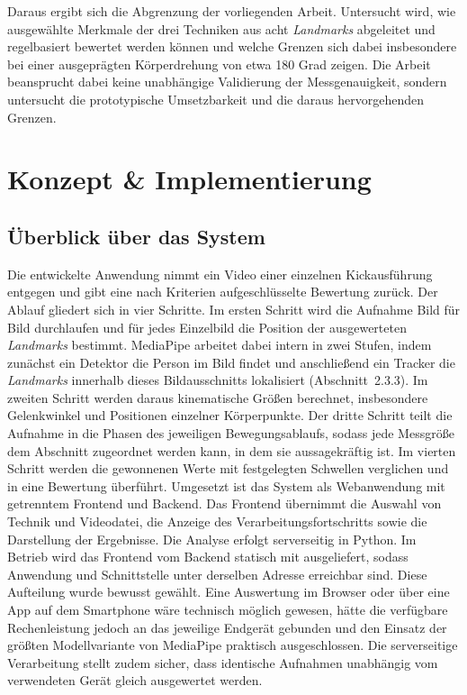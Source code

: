 \documentclass[intern]{cgMA}
\begin{document}
Daraus ergibt sich die Abgrenzung der vorliegenden Arbeit. Untersucht wird, wie ausgewählte Merkmale der drei Techniken aus acht \textit{Landmarks} abgeleitet und regelbasiert bewertet werden können und welche Grenzen sich dabei insbesondere bei einer ausgeprägten Körperdrehung von etwa 180 Grad zeigen. Die Arbeit beansprucht dabei keine unabhängige Validierung der Messgenauigkeit, sondern untersucht die prototypische Umsetzbarkeit und die daraus hervorgehenden Grenzen.
\section{Konzept \& Implementierung}
\subsection{Überblick über das System}
Die entwickelte Anwendung nimmt ein Video einer einzelnen Kickausführung entgegen und gibt eine nach Kriterien aufgeschlüsselte Bewertung zurück. Der Ablauf gliedert sich in vier Schritte.
Im ersten Schritt wird die Aufnahme Bild für Bild durchlaufen und für jedes Einzelbild die Position der ausgewerteten \textit{Landmarks} bestimmt. MediaPipe arbeitet dabei intern in zwei Stufen, indem zunächst ein Detektor die Person im Bild findet und anschließend ein Tracker die \textit{Landmarks} innerhalb dieses Bildausschnitts lokalisiert (Abschnitt~2.3.3).
Im zweiten Schritt werden daraus kinematische Größen berechnet, insbesondere Gelenkwinkel und Positionen einzelner Körperpunkte. Der dritte Schritt teilt die Aufnahme in die Phasen des jeweiligen Bewegungsablaufs, sodass jede Messgröße dem Abschnitt zugeordnet werden kann, in dem sie aussagekräftig ist. Im vierten Schritt werden die gewonnenen Werte mit festgelegten Schwellen verglichen und in eine Bewertung überführt.
Umgesetzt ist das System als Webanwendung mit getrenntem Frontend und Backend. Das Frontend übernimmt die Auswahl von Technik und Videodatei, die Anzeige des Verarbeitungsfortschritts sowie die Darstellung der Ergebnisse. Die Analyse erfolgt serverseitig in Python. Im Betrieb wird das Frontend vom Backend statisch mit ausgeliefert, sodass Anwendung und Schnittstelle unter derselben Adresse erreichbar sind.
Diese Aufteilung wurde bewusst gewählt. Eine Auswertung im Browser oder über eine App auf dem Smartphone wäre technisch möglich gewesen, hätte die verfügbare Rechenleistung jedoch an das jeweilige Endgerät gebunden und den Einsatz der größten Modellvariante von MediaPipe praktisch ausgeschlossen. Die serverseitige Verarbeitung stellt zudem sicher, dass identische Aufnahmen unabhängig vom verwendeten Gerät gleich ausgewertet werden.
\end{document}
